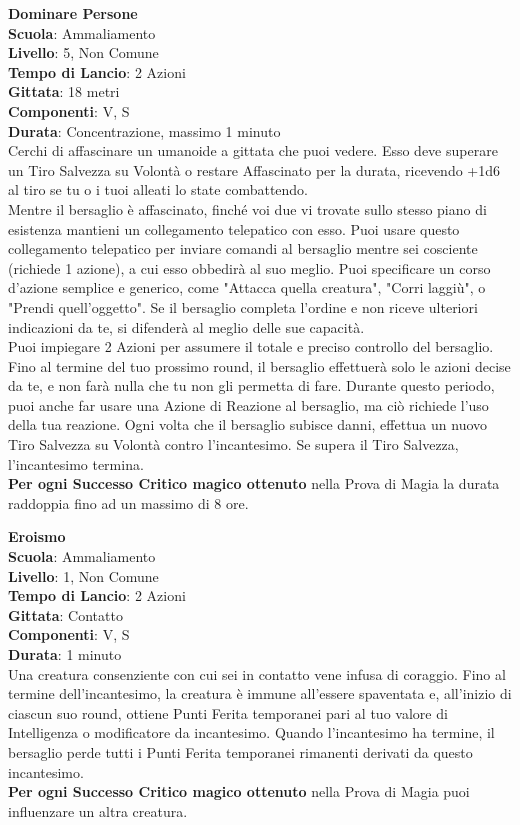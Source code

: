 \begin{multicols}{2}
\medskip\textbf{Dominare Persone}\\
\textbf{Scuola}: Ammaliamento\\
\textbf{Livello}: 5, Non Comune\\
\textbf{Tempo di Lancio}: 2 Azioni\\
\textbf{Gittata}: 18 metri\\
\textbf{Componenti}: V, S\\
\textbf{Durata}: Concentrazione, massimo 1 minuto\\
Cerchi di affascinare un umanoide a gittata che puoi vedere. Esso deve superare un Tiro Salvezza su Volontà o restare Affascinato per la durata, ricevendo +1d6 al tiro se tu o i tuoi alleati lo state combattendo.\\
Mentre il bersaglio è affascinato, finché voi due vi trovate sullo stesso piano di esistenza mantieni un collegamento telepatico con esso. Puoi usare questo collegamento telepatico per inviare comandi al bersaglio mentre sei cosciente (richiede 1 azione), a cui esso obbedirà al suo meglio. Puoi specificare un corso d'azione semplice e generico, come "Attacca quella creatura", "Corri laggiù", o "Prendi quell'oggetto". Se il bersaglio completa l'ordine e non riceve ulteriori indicazioni da te, si difenderà al meglio delle sue capacità.\\
Puoi impiegare 2 Azioni per assumere il totale e preciso controllo del bersaglio. Fino al termine del tuo prossimo round, il bersaglio effettuerà solo le azioni decise da te, e non farà nulla che tu non gli permetta di fare. Durante questo periodo, puoi anche far usare una Azione di Reazione al bersaglio, ma ciò richiede l'uso della tua reazione. Ogni volta che il bersaglio subisce danni, effettua un nuovo Tiro Salvezza su Volontà contro l'incantesimo. Se supera il Tiro Salvezza, l'incantesimo termina.\\
\textbf{Per ogni Successo Critico magico ottenuto} nella Prova di Magia la durata raddoppia fino ad un massimo di 8 ore.

\medskip\textbf{Eroismo}\\
\textbf{Scuola}: Ammaliamento\\
\textbf{Livello}: 1, Non Comune\\
\textbf{Tempo di Lancio}: 2 Azioni\\
\textbf{Gittata}: Contatto\\
\textbf{Componenti}: V, S\\
\textbf{Durata}: 1 minuto\\
Una creatura consenziente con cui sei in contatto vene infusa di coraggio. Fino al termine dell'incantesimo, la creatura è immune all'essere spaventata e, all'inizio di ciascun suo round, ottiene Punti Ferita temporanei pari al tuo valore di Intelligenza o modificatore da incantesimo. Quando l'incantesimo ha termine, il bersaglio perde tutti i Punti Ferita temporanei rimanenti derivati da questo incantesimo.\\
\textbf{Per ogni Successo Critico magico ottenuto} nella Prova di Magia puoi influenzare un altra creatura.


\end{multicols}
